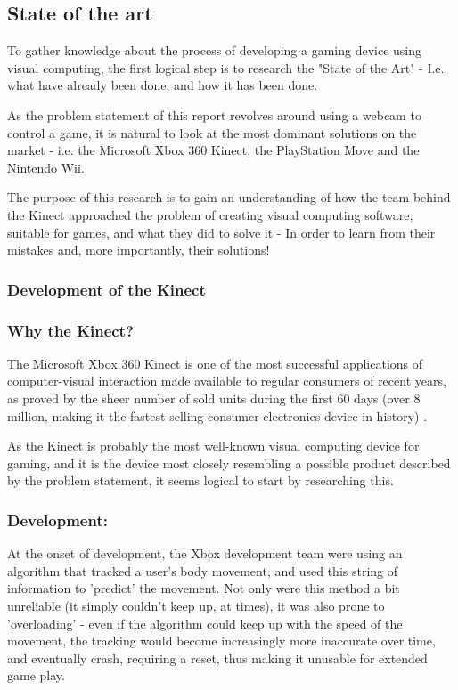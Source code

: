 \subsection{State of the art}
To gather knowledge about the process of developing a gaming device using visual computing, the first logical step is to research the "State of the Art" - I.e. what have already been done, and how it has been done.

As the problem statement of this report revolves around using a webcam to control a game, it is natural to look at the most dominant solutions on the market - i.e. the Microsoft Xbox 360 Kinect, the PlayStation Move and the Nintendo Wii.

The purpose of this research is to gain an understanding of how the team behind the Kinect approached the problem of creating visual computing software, suitable for games, and what they did to solve it - In order to learn from their mistakes and, more importantly, their solutions!

\subsubsection{Development of the Kinect}
\subsubsection*{Why the Kinect?}
The Microsoft Xbox 360 Kinect is one of the most successful applications of computer-visual interaction made available to regular consumers of recent years, as proved by the sheer number of sold units during the first 60 days (over 8 million, making it the fastest-selling consumer-electronics device in history) \parencite{Knies}.

As the Kinect is probably the most well-known visual computing device for gaming, and it is the device most closely resembling a possible product described by the problem statement, it seems logical to start by researching this.

\subsubsection*{Development:}
At the onset of development, the Xbox development team were using an algorithm that tracked a user's body movement, and used this string of information to 'predict' the movement. Not only were this method a bit unreliable (it simply couldn't keep up, at times), it was also prone to 'overloading' \parencite{Knies} - even if the algorithm could keep up with the speed of the movement, the tracking would become increasingly more inaccurate over time, and eventually crash, requiring a reset, thus making it unusable for extended game play.

